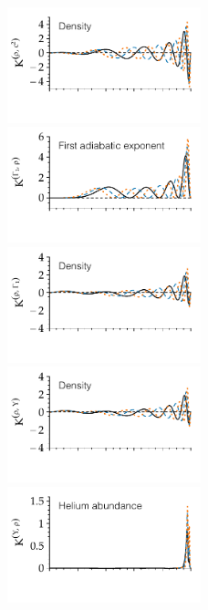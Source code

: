 \begin{figure}
    \includegraphics[width=0.5\textwidth,trim={0 1.1cm 0 0}, clip]{figs/pulse/kernels/kernel-n-rho_c2-diffusion.pdf}\\
    \includegraphics[width=0.5\textwidth,trim={0 1.1cm 0 0}, clip]{figs/pulse/kernels/kernel-n-Gamma1_rho-diffusion.pdf}%
    \includegraphics[width=0.5\textwidth,trim={0 1.1cm 0 0}, clip]{figs/pulse/kernels/kernel-n-rho_Gamma1-diffusion.pdf}\\
    \includegraphics[width=0.5\textwidth,trim={0 1.1cm 0 0}, clip]{figs/pulse/kernels/kernel-n-rho_Y-diffusion.pdf}%
    \includegraphics[width=0.5\textwidth,trim={0 1.1cm 0 0}, clip]{figs/pulse/kernels/kernel-n-Y_rho-diffusion.pdf}\\

\end{figure}
